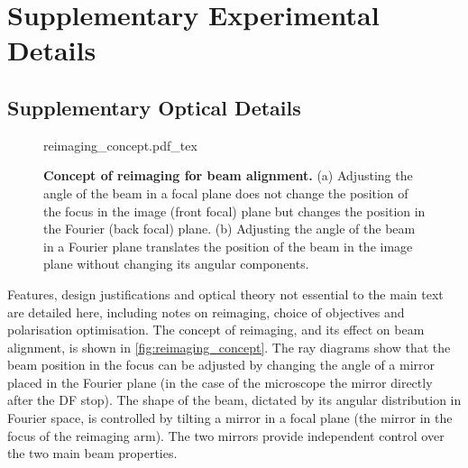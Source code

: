 \documentclass[12pt, a4paper, oneside]{book}
\begin{document}
\FloatBarrier
\chapter{Supplementary Experimental Details}

\section{Supplementary Optical Details}

\begin{figure}[bt]
\centering
\fontsize{10pt}{1em}\selectfont
\def\svgwidth{0.9\textwidth}
{reimaging_concept.pdf_tex}
\caption[Concept of reimaging for beam alignment]{\textbf{Concept of reimaging for beam alignment.} (a) Adjusting the angle of the beam in a focal plane does not change the position of the focus in the image (front focal) plane but changes the position in the Fourier (back focal) plane. (b) Adjusting the angle of the beam in a Fourier plane translates the position of the beam in the image plane without changing its angular components.}
\label{fig:reimaging_concept}
\end{figure}

Features, design justifications and optical theory not essential to the main text are detailed here, including notes on reimaging, choice of objectives and polarisation optimisation. The concept of reimaging, and its effect on beam alignment, is shown in \autoref{fig:reimaging_concept}. The ray diagrams show that the beam position in the focus can be adjusted by changing the angle of a mirror placed in the Fourier plane (in the case of the microscope the mirror directly after the DF stop). The shape of the beam, dictated by its angular distribution in Fourier space, is controlled by tilting a mirror in a focal plane (the mirror in the focus of the reimaging arm). The two mirrors provide independent control over the two main beam properties.
\end{document}
